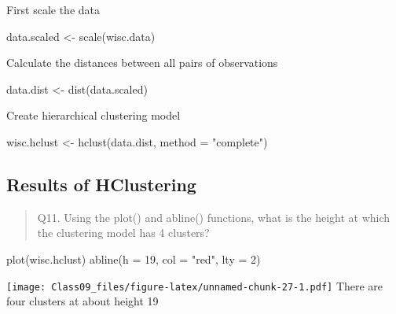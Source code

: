 \documentclass[
]{article}
\newenvironment{Shaded}{\begin{snugshade}}{\end{snugshade}}
\newcommand{\AttributeTok}[1]{\textcolor[rgb]{0.77,0.63,0.00}{#1}}
\newcommand{\DecValTok}[1]{\textcolor[rgb]{0.00,0.00,0.81}{#1}}
\newcommand{\FunctionTok}[1]{\textcolor[rgb]{0.00,0.00,0.00}{#1}}
\newcommand{\NormalTok}[1]{#1}
\newcommand{\OtherTok}[1]{\textcolor[rgb]{0.56,0.35,0.01}{#1}}
\newcommand{\StringTok}[1]{\textcolor[rgb]{0.31,0.60,0.02}{#1}}
\begin{document}
First scale the data

\begin{Shaded}
\begin{Highlighting}[]
\NormalTok{data.scaled }\OtherTok{\textless{}{-}} \FunctionTok{scale}\NormalTok{(wisc.data)}
\end{Highlighting}
\end{Shaded}

Calculate the distances between all pairs of observations

\begin{Shaded}
\begin{Highlighting}[]
\NormalTok{data.dist }\OtherTok{\textless{}{-}} \FunctionTok{dist}\NormalTok{(data.scaled)}
\end{Highlighting}
\end{Shaded}

Create hierarchical clustering model

\begin{Shaded}
\begin{Highlighting}[]
\NormalTok{wisc.hclust }\OtherTok{\textless{}{-}} \FunctionTok{hclust}\NormalTok{(data.dist, }\AttributeTok{method =} \StringTok{"complete"}\NormalTok{)}
\end{Highlighting}
\end{Shaded}

\hypertarget{results-of-hclustering}{%
\subsection{Results of HClustering}\label{results-of-hclustering}}

\begin{quote}
Q11. Using the plot() and abline() functions, what is the height at
which the clustering model has 4 clusters?
\end{quote}

\begin{Shaded}
\begin{Highlighting}[]
\FunctionTok{plot}\NormalTok{(wisc.hclust)}
\FunctionTok{abline}\NormalTok{(}\AttributeTok{h =} \DecValTok{19}\NormalTok{, }\AttributeTok{col =} \StringTok{"red"}\NormalTok{, }\AttributeTok{lty =} \DecValTok{2}\NormalTok{)}
\end{Highlighting}
\end{Shaded}

\texttt{[image: Class09\_files/figure-latex/unnamed-chunk-27-1.pdf]}
There are four clusters at about height 19
\end{document}
